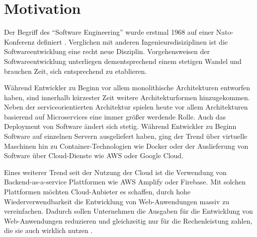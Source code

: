 \section{Motivation}

Der Begriff des "`Software Engineering"' wurde erstmal 1968 auf einer Nato-Konferenz definiert \autocite{naur1969software}. Verglichen mit anderen Ingenieursdisiziplinen ist die Softwareentwicklung eine recht neue Disziplin. Vorgehensweisen der Softwareentwicklung unterliegen dementsprechend einem stetigen Wandel und brauchen Zeit, sich entsprechend zu etablieren.

Während Entwickler zu Beginn vor allem monolithische Architekturen entworfen haben, sind innerhalb kürzester Zeit weitere Architekturformen hinzugekommen. Neben der serviceorientierten Architektur spielen heute vor allem Architekturen basierend auf Microservices eine immer größer werdende Rolle. Auch das Deployment von Software ändert sich stetig. Während Entwickler zu Beginn Software auf einzelnen Servern ausgeliefert haben, ging der Trend über virtuelle Maschinen hin zu Container-Technologien wie Docker oder der Auslieferung von Software über Cloud-Dienste wie \ac{AWS} oder Google Cloud.

Eines weiterer Trend seit der Nutzung der Cloud ist die Verwendung von Backend-as-a-service Plattformen wie \ac{AWS} Amplify oder Firebase. Mit solchen Plattformen möchten Cloud-Anbieter es schaffen, durch hohe Wiederverwendbarkeit die Entwicklung von Web-Anwendungen massiv zu vereinfachen. Dadurch sollen Unternehmen die Ausgaben für die Entwicklung von Web-Anwendungen reduzieren und gleichzeitig nur für die Rechenleistung zahlen, die sie auch wirklich nutzen \autocite{villamizar2017cost}.